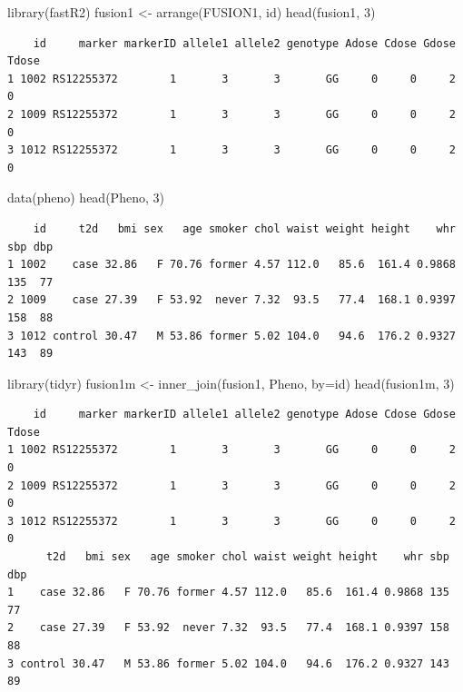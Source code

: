 \documentclass[
  ngerman,
]{scrbook}
\newenvironment{Shaded}{\begin{snugshade}}{\end{snugshade}}
\newcommand{\AttributeTok}[1]{\textcolor[rgb]{0.77,0.63,0.00}{#1}}
\newcommand{\DecValTok}[1]{\textcolor[rgb]{0.00,0.00,0.81}{#1}}
\newcommand{\FunctionTok}[1]{\textcolor[rgb]{0.00,0.00,0.00}{#1}}
\newcommand{\NormalTok}[1]{#1}
\newcommand{\OtherTok}[1]{\textcolor[rgb]{0.56,0.35,0.01}{#1}}
\newcommand{\StringTok}[1]{\textcolor[rgb]{0.31,0.60,0.02}{#1}}
\begin{document}
\begin{Shaded}
\begin{Highlighting}[]
\FunctionTok{library}\NormalTok{(fastR2)}
\NormalTok{fusion1 }\OtherTok{\textless{}{-}} \FunctionTok{arrange}\NormalTok{(FUSION1, id)}
\FunctionTok{head}\NormalTok{(fusion1, }\DecValTok{3}\NormalTok{)}
\end{Highlighting}
\end{Shaded}

\begin{verbatim}
    id     marker markerID allele1 allele2 genotype Adose Cdose Gdose Tdose
1 1002 RS12255372        1       3       3       GG     0     0     2     0
2 1009 RS12255372        1       3       3       GG     0     0     2     0
3 1012 RS12255372        1       3       3       GG     0     0     2     0
\end{verbatim}

\begin{Shaded}
\begin{Highlighting}[]
\FunctionTok{data}\NormalTok{(pheno)}
\FunctionTok{head}\NormalTok{(Pheno, }\DecValTok{3}\NormalTok{)}
\end{Highlighting}
\end{Shaded}

\begin{verbatim}
    id     t2d   bmi sex   age smoker chol waist weight height    whr sbp dbp
1 1002    case 32.86   F 70.76 former 4.57 112.0   85.6  161.4 0.9868 135  77
2 1009    case 27.39   F 53.92  never 7.32  93.5   77.4  168.1 0.9397 158  88
3 1012 control 30.47   M 53.86 former 5.02 104.0   94.6  176.2 0.9327 143  89
\end{verbatim}

\begin{Shaded}
\begin{Highlighting}[]
\FunctionTok{library}\NormalTok{(tidyr)}
\NormalTok{fusion1m }\OtherTok{\textless{}{-}} \FunctionTok{inner\_join}\NormalTok{(fusion1, Pheno, }\AttributeTok{by=}\StringTok{\textquotesingle{}id\textquotesingle{}}\NormalTok{)}
\FunctionTok{head}\NormalTok{(fusion1m, }\DecValTok{3}\NormalTok{)}
\end{Highlighting}
\end{Shaded}

\begin{verbatim}
    id     marker markerID allele1 allele2 genotype Adose Cdose Gdose Tdose
1 1002 RS12255372        1       3       3       GG     0     0     2     0
2 1009 RS12255372        1       3       3       GG     0     0     2     0
3 1012 RS12255372        1       3       3       GG     0     0     2     0
      t2d   bmi sex   age smoker chol waist weight height    whr sbp dbp
1    case 32.86   F 70.76 former 4.57 112.0   85.6  161.4 0.9868 135  77
2    case 27.39   F 53.92  never 7.32  93.5   77.4  168.1 0.9397 158  88
3 control 30.47   M 53.86 former 5.02 104.0   94.6  176.2 0.9327 143  89
\end{verbatim}
\end{document}
